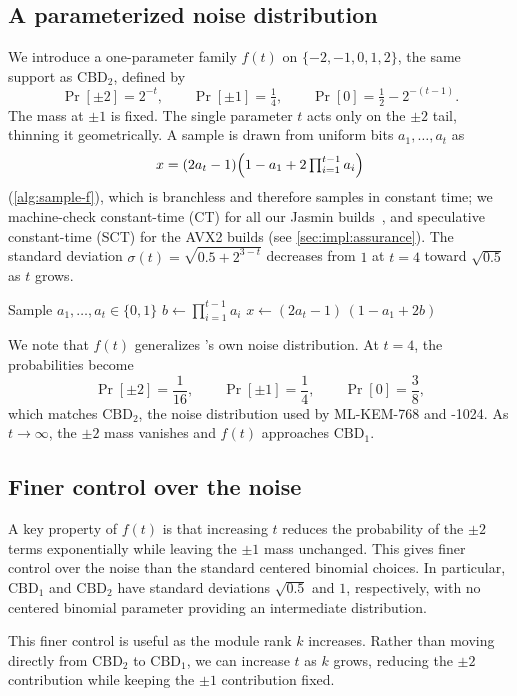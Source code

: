 \subsection{A parameterized noise distribution}
We introduce a one-parameter family $f(t)$ on $\{-2,-1,0,1,2\}$, the same
support as $\mathrm{CBD}_2$, defined by
$$
  \Pr[\pm 2] = 2^{-t}, \qquad
  \Pr[\pm 1] = \tfrac14, \qquad
  \Pr[0] = \tfrac12 - 2^{-(t-1)}.
$$
The mass at $\pm 1$ is fixed. The single parameter $t$ acts only on the
$\pm 2$ tail, thinning it geometrically. A sample is drawn from uniform
bits $a_1,\dots,a_t$ as $$x = (2a_t - 1)\Bigl(1 - a_1 + 2\textstyle\prod_{i=1}^{t-1} a_i\Bigr)$$
(\cref{alg:sample-f}),
which is branchless and therefore samples in constant time; we
machine-check constant-time (CT) for all our Jasmin builds~\cite{CCS:ABBBGL17}, and speculative constant-time (SCT)
for the AVX2 builds (see \cref{sec:impl:assurance}). The standard deviation
$\sigma(t) = \sqrt{0.5 + 2^{3-t}}$ decreases from $1$ at $t=4$ toward
$\sqrt{0.5}$ as $t$ grows.

\begin{algorithm}[t]
  \DontPrintSemicolon
  \caption{\textsf{Sample}-$f(t)$}
  \label{alg:sample-f}
  Sample $a_1,\dots,a_t \in \{0,1\}$\;
  $b \gets \prod_{i=1}^{t-1} a_i$\;
  $x \gets (2a_t - 1)\,(1 - a_1 + 2b)$\;
  \;
\end{algorithm}

We note that $f(t)$ generalizes \kyber's own noise distribution. At $t=4$, the probabilities become
$$
  \Pr[\pm 2] = \frac{1}{16}, \qquad
  \Pr[\pm 1] = \frac14, \qquad
  \Pr[0] = \frac38,
$$ which matches $\mathrm{CBD}_2$, the noise distribution used by ML-KEM-768 and -1024. As $t \to \infty$, the $\pm 2$ 
mass vanishes and $f(t)$ approaches $\mathrm{CBD}_1$.

\subsection{Finer control over the noise}
A key property of $f(t)$ is that increasing $t$ reduces the probability of the $\pm2$ terms exponentially while leaving the $\pm1$ mass unchanged. This gives finer control over the noise than the standard centered binomial
choices. In particular, $\mathrm{CBD}_1$ and $\mathrm{CBD}_2$ have standard deviations $\sqrt{0.5}$ and $1$, 
respectively, with no centered binomial parameter providing an intermediate distribution.

This finer control is useful as the module rank $k$ increases. Rather
than moving directly from $\mathrm{CBD}_2$ to $\mathrm{CBD}_1$, we can
increase $t$ as $k$ grows, reducing the $\pm2$ contribution
while keeping the $\pm1$ contribution fixed.

